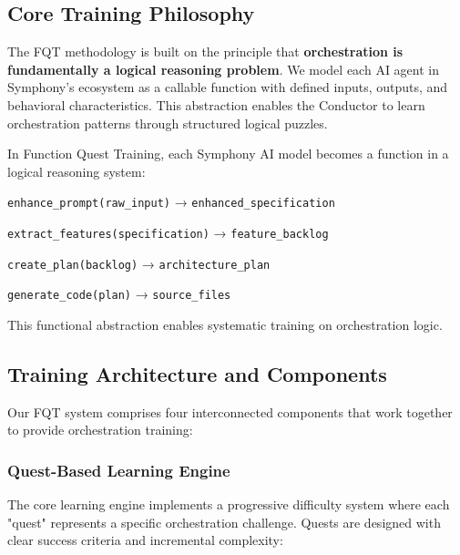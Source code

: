 \subsection*{Core Training Philosophy}

The FQT methodology is built on the principle that \textbf{orchestration is fundamentally a logical reasoning problem}. We model each AI agent in Symphony's ecosystem as a callable function with defined inputs, outputs, and behavioral characteristics. This abstraction enables the Conductor to learn orchestration patterns through structured logical puzzles.

\begin{infobox}[title=Key Insight: Models as Functions]
In Function Quest Training, each Symphony AI model becomes a function in a logical reasoning system:
\begin{compactlist}
    \item \texttt{enhance\_prompt(raw\_input)} → \texttt{enhanced\_specification}
    \item \texttt{extract\_features(specification)} → \texttt{feature\_backlog}
    \item \texttt{create\_plan(backlog)} → \texttt{architecture\_plan}
    \item \texttt{generate\_code(plan)} → \texttt{source\_files}
\end{compactlist}
This functional abstraction enables systematic training on orchestration logic.
\end{infobox}

\subsection*{Training Architecture and Components}

Our FQT system comprises four interconnected components that work together to provide orchestration training:

\subsubsection*{Quest-Based Learning Engine}

The core learning engine implements a progressive difficulty system where each "quest" represents a specific orchestration challenge. Quests are designed with clear success criteria and incremental complexity:

